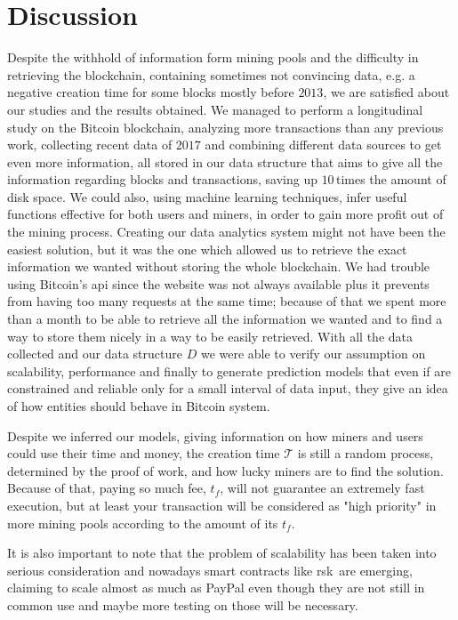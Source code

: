 \documentclass[USenglish]{uit-thesis}
\begin{document}
\section{Discussion}
\label{sec:discussion}
Despite the withhold of information form mining pools
and the difficulty in retrieving the blockchain, containing
sometimes not convincing data, e.g. a negative creation time
for some blocks mostly before $2013$, we are satisfied about
our studies and the results obtained. We managed to
perform a longitudinal study on the Bitcoin blockchain,
analyzing more transactions than any previous work,
collecting recent data of $2017$ and combining
different data sources to get even more information, all
stored in our data structure that aims to give
all the information regarding blocks and transactions, saving
up $10$\,times the amount of disk space.
We could also, using machine
learning techniques, infer useful functions effective for
both users and miners, in order to gain more profit
out of the mining process.
Creating our
data analytics system
might not have been the easiest solution,
but it was the one which allowed us to retrieve
the exact information we wanted without storing the whole
blockchain. We had trouble using Bitcoin's \gls{api}
since the website was not always available plus
it prevents from having too many requests at
the same time; because of that we spent more than a month
to be able to retrieve all the information
we wanted and to find a way to store them
nicely in a way to be easily retrieved.
With all the data collected and our data structure
$D$ we were able to verify our assumption
on scalability, performance and finally
to generate prediction models that even if
are constrained and reliable only for a small interval
of data input, they give an idea of how entities
should behave in Bitcoin system.

Despite we inferred our models, giving
information on how miners and users could use their time
and money, the creation time $\mathcal{T}$
is still a random process, determined by the proof of work,
and how lucky miners are to find the solution. Because of that,
paying so much fee, $t_f$, will not guarantee
an extremely fast execution, but at least your
transaction will be considered as "high priority"
in more mining pools according to the amount of its $t_f$.

It is also important to note that the problem of scalability
has been taken into serious consideration and nowadays
smart contracts like \gls{rsk}\,\cite{rsk} are
emerging, claiming to scale almost as much as PayPal even
though they are not still in common use and
maybe more testing on those will be necessary.
\end{document}
